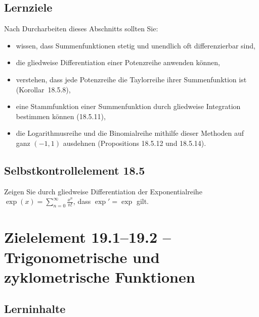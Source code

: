 \documentclass[a4paper,12pt]{article}
\begin{document}
\subsection*{Lernziele}

Nach Durcharbeiten dieses Abschnitts sollten Sie:
\begin{itemize}
  \item wissen, dass Summenfunktionen stetig und unendlich oft differenzierbar sind,
  \item die gliedweise Differentiation einer Potenzreihe anwenden können,
  \item verstehen, dass jede Potenzreihe die Taylorreihe ihrer Summenfunktion ist
        (Korollar~18.5.8),
  \item eine Stammfunktion einer Summenfunktion durch gliedweise Integration
        bestimmen können (18.5.11),
  \item die Logarithmusreihe und die Binomialreihe mithilfe dieser Methoden auf
        ganz $(-1, 1)$ ausdehnen (Propositions 18.5.12 und 18.5.14).
\end{itemize}

\subsection*{Selbstkontrollelement 18.5}

Zeigen Sie durch gliedweise Differentiation der Exponentialreihe
$\exp(x) = \sum_{n=0}^{\infty} \frac{x^n}{n!}$, dass $\exp' = \exp$ gilt.

\newpage

\section*{Zielelement 19.1--19.2 -- Trigonometrische und zyklometrische Funktionen}

\subsection*{Lerninhalte}
\end{document}
